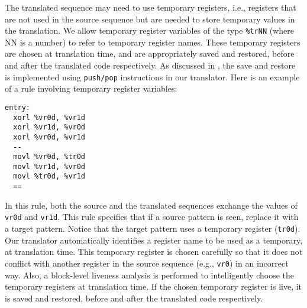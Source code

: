 \documentclass[9pt]{article}
\begin{document}
The translated sequence may need to use temporary registers, i.e., registers
that are not used in the source sequence but are needed to store
temporary values in the translation. We allow temporary register variables
of the type {\tt \%trNN} (where NN is a number) to refer to
temporary register names. These temporary registers are chosen at
translation time, and are appropriately saved and restored, before and
after the translated code respectively. As discussed in \cite{sosp13},
the save and restore is implemented using {\tt push/pop} instructions in
our translator.
Here is an example of a rule involving temporary register variables:
\begin{verbatim}
entry:
  xorl %vr0d, %vr1d
  xorl %vr1d, %vr0d
  xorl %vr0d, %vr1d
  --
  movl %vr0d, %tr0d
  movl %vr1d, %vr0d
  movl %tr0d, %vr1d
  ==
\end{verbatim}
In this rule, both the source and the translated sequences exchange the
values of {\tt vr0d} and {\tt vr1d}. This rule specifies that if a source
pattern is seen, replace it with a target pattern. Notice that the target
pattern uses a temporary register ({\tt tr0d}). Our translator automatically
identifies a register name to be used as a temporary, at translation time.
This temporary register is chosen carefully so that it does not conflict with
another register in the source sequence (e.g., {\tt vr0}) in an incorrect
way.
Also, a block-level liveness analysis is
performed to intelligently choose the temporary registers at translation time.
If the chosen temporary register is live, it is saved and restored, before
and after the translated code respectively.
\end{document}

